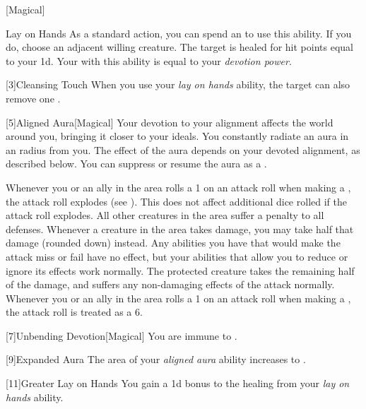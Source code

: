         [Magical]
        \begin{ability}{Lay on Hands}
            As a standard action, you can spend an  to use this ability.
            If you do, choose an adjacent willing creature.
            The target is healed for hit points equal to your  \plus1d.
            Your  with this ability is equal to your \textit{devotion power}.
        \end{ability}

        [3]{Cleansing Touch} When you use your \textit{lay on hands} ability, the target can also remove one .

        [5]{Aligned Aura}[Magical]
        Your devotion to your alignment affects the world around you, bringing it closer to your ideals.
        You constantly radiate an aura in an \areamed radius  from you.
        The effect of the aura depends on your devoted alignment, as described below.
        You can suppress or resume the aura as a .

         Whenever you or an ally in the area rolls a 1 on an attack roll when making a , the attack roll explodes (see ).
        This does not affect additional dice rolled if the attack roll explodes.
         All other creatures in the area suffer a  penalty to all defenses.
         Whenever a creature in the area takes damage, you may take half that damage (rounded down) instead.
        Any abilities you have that would make the attack miss or fail have no effect, but your abilities that allow you to reduce or ignore its effects work normally.
        The protected creature takes the remaining half of the damage, and suffers any non-damaging effects of the attack normally.
         Whenever you or an ally in the area rolls a 1 on an attack roll when making a , the attack roll is treated as a 6.

        [7]{Unbending Devotion}[Magical]
        You are immune to  .

        [9]{Expanded Aura}
        The area of your \textit{aligned aura} ability increases to \arealarge.

        [11]{Greater Lay on Hands} 
        You gain a \plus1d bonus to the healing from your \textit{lay on hands} ability.

